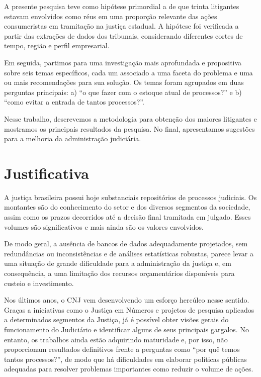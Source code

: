 \documentclass[]{report}
\begin{document}
A presente pesquisa teve como hipótese primordial a de que trinta
litigantes estavam envolvidos como réus em uma proporção relevante das
ações consumeristas em tramitação na justiça estadual. A hipótese foi
verificada a partir das extrações de dados dos tribunais, considerando
diferentes cortes de tempo, região e perfil empresarial.

Em seguida, partimos para uma investigação mais aprofundada e
propositiva sobre seis temas específicos, cada um associado a uma faceta
do problema e uma ou mais recomendações para sua solução. Os temas foram
agrupados em duas perguntas principais: a) ``o que fazer com o estoque
atual de processos?'' e b) ``como evitar a entrada de tantos
processos?''.

Nesse trabalho, descrevemos a metodologia para obtenção dos maiores
litigantes e mostramos os principais resultados da pesquisa. No final,
apresentamos sugestões para a melhoria da administração
judiciária.

\section{Justificativa}\label{justificativa}

A justiça brasileira possui hoje substanciais repositórios de processos
judiciais. Os montantes são do conhecimento do setor e dos diversos
segmentos da sociedade, assim como os prazos decorridos até a decisão
final tramitada em julgado. Esses volumes são significativos e mais
ainda são os valores envolvidos.

De modo geral, a ausência de bancos de dados adequadamente projetados,
sem redundâncias ou inconsistências e de análises estatísticas robustas,
parece levar a uma situação de grande dificuldade para a administração
da justiça e, em consequência, a uma limitação dos recursos
orçamentários disponíveis para custeio e investimento.

Nos últimos anos, o CNJ vem desenvolvendo um esforço hercúleo nesse
sentido. Graças a iniciativas como o Justiça em Números e projetos de
pesquisa aplicados a determinados segmentos da Justiça, já é possível
obter visões gerais do funcionamento do Judiciário e identificar alguns
de seus principais gargalos. No entanto, os trabalhos ainda estão
adquirindo maturidade e, por isso, não proporcionam resultados definitivos
frente a perguntas como ``por quê temos tantos processos?'', de modo que
há dificuldades em elaborar políticas públicas adequadas para resolver
problemas importantes como reduzir o volume de ações.
\end{document}
